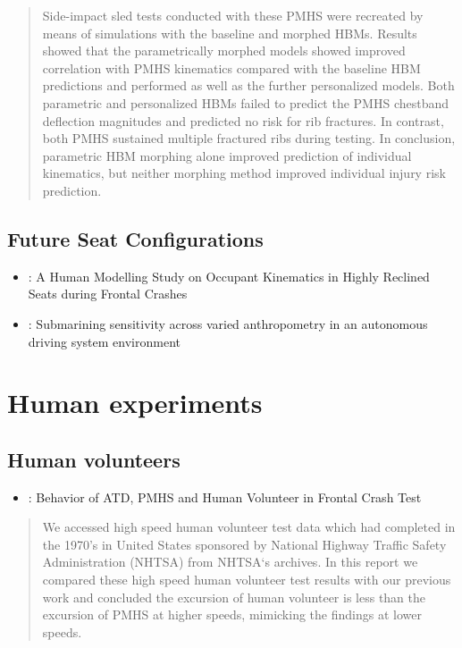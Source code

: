 \documentclass[]{book}
\providecommand{\tightlist}{%
  \setlength{\itemsep}{0pt}\setlength{\parskip}{0pt}}
\begin{document}
\begin{quote}
Side-impact sled tests conducted with these PMHS were recreated by means of simulations with the baseline and morphed HBMs. Results showed that the parametrically morphed models showed improved correlation with PMHS kinematics compared with the baseline HBM predictions and performed as well as the further personalized models. Both parametric and personalized HBMs failed to predict the PMHS chestband deflection magnitudes and predicted no risk for rib fractures. In contrast, both PMHS sustained multiple fractured ribs during testing. In conclusion, parametric HBM morphing alone improved prediction of individual kinematics, but neither morphing method improved individual injury risk prediction.
\end{quote}

\hypertarget{future-seat-configurations}{%
\section{Future Seat Configurations}\label{future-seat-configurations}}

\begin{itemize}
\item
  \citet{Boyle2019}: A Human Modelling Study on Occupant Kinematics in Highly Reclined Seats during Frontal Crashes
\item
  \citet{Rawska2019}: Submarining sensitivity across varied anthropometry in an autonomous driving system environment
\end{itemize}

\hypertarget{human-experiments}{%
\chapter{Human experiments}\label{human-experiments}}

\hypertarget{human-volunteers}{%
\section{Human volunteers}\label{human-volunteers}}

\begin{itemize}
\tightlist
\item
  \citet{Higuchi2019}: Behavior of ATD, PMHS and Human Volunteer in Frontal Crash Test
\end{itemize}

\begin{quote}
We accessed high speed human volunteer test data which had completed in the 1970's in United States sponsored by National Highway Traffic Safety Administration (NHTSA) from NHTSA`s archives. In this report we compared these high speed human volunteer test results with our previous work and concluded the excursion of human volunteer is less than the excursion of PMHS at higher speeds, mimicking the findings at lower speeds.
\end{quote}
\end{document}

